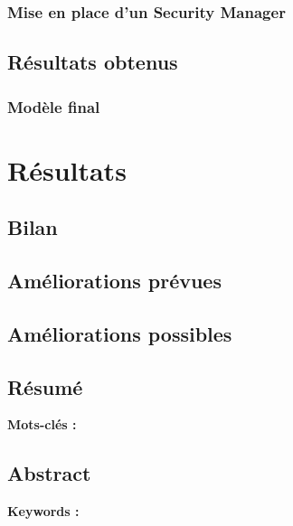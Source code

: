 \documentclass[stage]{tnreport}
\begin{document}
\subsection{Mise en place d'un Security Manager}

\section{Résultats obtenus}

\subsection{Modèle final}

\cleardoublepage 

\chapter{Résultats}

\section{Bilan}

\section{Améliorations prévues}

\section {Améliorations possibles}

\cleardoublepage
\thispagestyle{empty}

\section*{Résumé}

{\bf Mots-clés :}


\section*{Abstract}

{\bf Keywords :}
\end{document}
